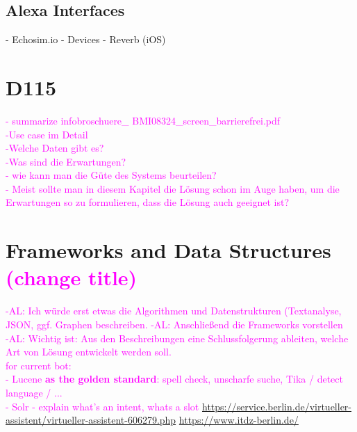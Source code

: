 \subsection{Alexa Interfaces}
- Echosim.io
- Devices
- Reverb (iOS)

\section{D115}
\textcolor{magenta}{
	- summarize infobroschuere\_ BMI08324\_screen\_barrierefrei.pdf\\
	-Use case im Detail\\
	-Welche Daten gibt es?\\	  
	-Was sind die Erwartungen?\\ 	
	- wie kann man die G\"ute des Systems beurteilen?\\   
	- Meist sollte man in diesem Kapitel die L\"osung schon im Auge haben, um die Erwartungen so zu formulieren, dass die L\"osung auch geeignet ist?\\ 
}


\section{Frameworks and Data Structures \textcolor{magenta}{(change title)}}

\textcolor{magenta}{-AL: Ich w\"urde erst etwas die Algorithmen und Datenstrukturen (Textanalyse, JSON, ggf. Graphen beschreiben. 
	-AL: Anschlie{\ss}end die Frameworks vorstellen\\ 
	-AL: Wichtig ist: Aus den Beschreibungen eine Schlussfolgerung ableiten, welche Art von L\"osung entwickelt werden soll.\\
for current bot: \\
- Lucene \textbf{as the golden standard}: spell check, unscharfe suche, Tika / detect language / ... \\
- Solr
- explain what's an intent, whats a slot
\url{https://service.berlin.de/virtueller-assistent/virtueller-assistent-606279.php}
\url{https://www.itdz-berlin.de/}
}


